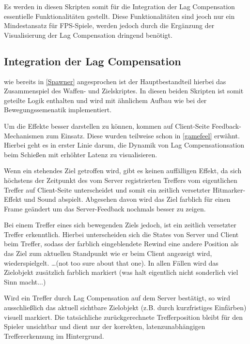 \begin{enumerate}
Es werden in diesen Skripten somit für die Integration der Lag Compensation essentielle Funktionalitäten gestellt. Diese Funktionalitäten sind jeoch nur ein Mindestansatz für FPS-Spiele, werden jedoch durch die Ergänzung der Visualisierung der Lag Compensation dringend benötigt.

\subsection{Integration der Lag Compensation}
\label{custom-lag-comp}
wie bereits in \ref{Spawner} angesprochen ist der 
Hauptbestandteil hierbei das Zusammenspiel des Waffen- und Zielskriptes. In diesen beiden Skripten ist somit geteilte Logik enthalten und wird mit ähnlichem Aufbau wie bei der Bewegungssemenatik implementiert.

Um die Effekte besser darstellen zu können, kommen auf Client-Seite Feedback-Mechanismen zum Einsatz. Diese wurden teilweise schon in \ref{gamefeel} erwähnt. 
Hierbei geht es in erster Linie darum, die Dynamik von Lag Compensationsation beim Schießen mit erhöhter Latenz zu visualisieren.

Wenn ein stehendes Ziel getroffen wird, gibt es keinen auffälligen Effekt, da sich höchstens der Zeitpunkt des vom Server registrierten Treffers vom eigentlichen Treffer auf Client-Seite unterscheidet und somit ein zeitlich versetzter Hitmarker-Effekt und Sound abspielt.
Abgesehen davon wird das Ziel farblich für einen Frame geändert um das Server-Feedback nochmals besser zu zeigen. 

Bei einem Treffer eines sich bewegenden Ziels jedoch, ist ein zeitlich versetzter Treffer erkenntlich. Hierbei unterscheiden sich die States von Server und Client beim Treffer, sodass der farblich eingeblendete Rewind eine andere Position als das Ziel zum aktuellen Standpunkt wie er beim Client angezeigt wird, wiederspielgelt.
\dots (not too sure about that one).
In allen Fällen wird das Zielobjekt zusätzlich farblich markiert (was halt eigentlich nicht sonderlich viel Sinn macht...)

Wird ein Treffer durch Lag Compensation auf dem Server bestätigt, so wird ausschließlich das aktuell sichtbare Zielobjekt (z.B. durch kurzfristiges Einfärben) visuell markiert. Die tatsächliche zurückgerechnete Trefferposition bleibt für den Spieler unsichtbar und dient nur der korrekten, latenzunabhängigen Treffererkennung im Hintergrund.


\end{enumerate}
